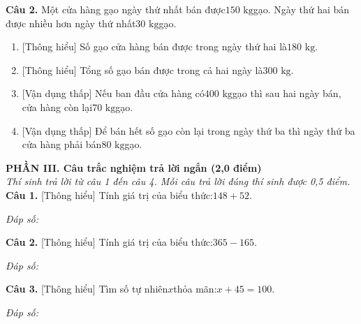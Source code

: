 \documentclass[11pt,a4paper]{article}
\begin{document}
\noindent\textbf{Câu 2.} Một cửa hàng gạo ngày thứ nhất bán được$150\text{ kg}$gạo. Ngày thứ hai bán được nhiều hơn ngày thứ nhất$30\text{ kg}$gạo.\par\vspace{2pt}
\begin{enumerate}[label=\textbf{\alph*)}, leftmargin=1.2cm, itemsep=2pt, topsep=2pt]
  \item \textnormal{[Thông hiểu]} Số gạo cửa hàng bán được trong ngày thứ hai là$180\text{ kg}$.
  \item \textnormal{[Thông hiểu]} Tổng số gạo bán được trong cả hai ngày là$300\text{ kg}$.
  \item \textnormal{[Vận dụng thấp]} Nếu ban đầu cửa hàng có$400\text{ kg}$gạo thì sau hai ngày bán, cửa hàng còn lại$70\text{ kg}$gạo.
  \item \textnormal{[Vận dụng thấp]} Để bán hết số gạo còn lại trong ngày thứ ba thì ngày thứ ba cửa hàng phải bán$80\text{ kg}$gạo.
\end{enumerate}
\vspace{6pt}


\vspace{6pt}
\noindent
\textbf{\large PHẦN III. Câu trắc nghiệm trả lời ngắn (2,0 điểm)}\\
\textit{\small Thí sinh trả lời từ câu 1 đến câu 4. Mỗi câu trả lời đúng thí sinh được 0,5 điểm.}
\vspace{6pt}
\noindent\textbf{Câu 1.} [Thông hiểu] Tính giá trị của biểu thức:$148 + 52$.\par\vspace{2pt}
\noindent\textit{Đáp số:} \dotfill\par\vspace{6pt}

\noindent\textbf{Câu 2.} [Thông hiểu] Tính giá trị của biểu thức:$365 - 165$.\par\vspace{2pt}
\noindent\textit{Đáp số:} \dotfill\par\vspace{6pt}

\noindent\textbf{Câu 3.} [Thông hiểu] Tìm số tự nhiên$x$thỏa mãn:$x + 45 = 100$.\par\vspace{2pt}
\noindent\textit{Đáp số:} \dotfill\par\vspace{6pt}
\end{document}
